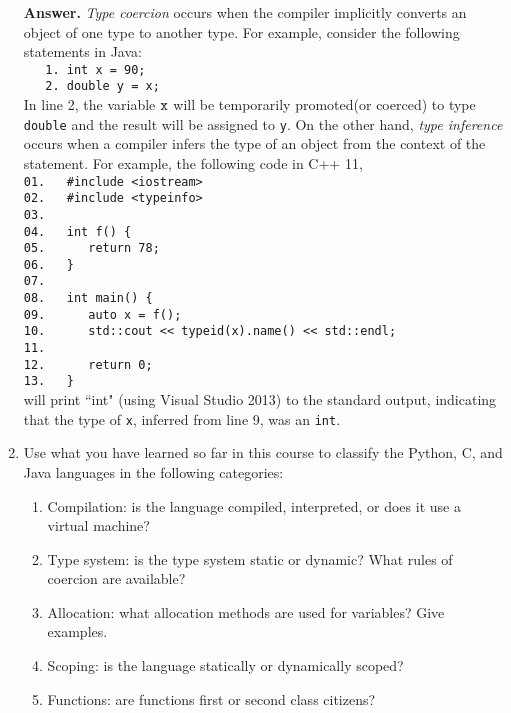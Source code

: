 \documentclass[9pt]{article}
\begin{document}
\begin{enumerate}
      \textbf{Answer.} \textit{Type coercion} occurs when the compiler
      implicitly converts an object of one type to another type. For example, 
      consider the following statements in Java: \\

      \verb|   1. int x = 90;| \\
      \verb|   2. double y = x;| \\

      In line 2, the variable $\verb|x|$ will be temporarily promoted(or
      coerced) to type \verb|double| and the result will be assigned to
      \verb|y|. On the other hand, \textit{type inference} occurs when a
      compiler infers the type of an object from the context of the statement.
      For example, the following code in C++ 11,\\

      \verb|01.   #include <iostream>| \\
      \verb|02.   #include <typeinfo>| \\
      \verb|03.| \\
      \verb|04.   int f() {| \\
      \verb|05.      return 78;| \\
      \verb|06.   }| \\
      \verb|07.| \\
      \verb|08.   int main() {| \\
      \verb|09.      auto x = f();| \\
      \verb|10.      std::cout << typeid(x).name() << std::endl;| \\
      \verb|11.| \\
      \verb|12.      return 0;| \\
      \verb|13.   }| \\

      will print ``int" (using Visual Studio 2013) to the standard output, 
      indicating that the type of \verb|x|, inferred from line 9, was an
      \verb|int|.
   \item Use what you have learned so far in this course to classify the Python,
         C, and Java languages in the following categories:

         \begin{enumerate}
            \item Compilation: is the language compiled, interpreted, or does it
                  use a virtual machine?
            \item Type system: is the type system static or dynamic? What rules
                  of coercion are available?
            \item Allocation: what allocation methods are used for variables?
                  Give examples.
            \item Scoping: is the language statically or dynamically scoped?
            \item Functions: are functions first or second class citizens?
         \end{enumerate}


\end{enumerate}
\end{document}
